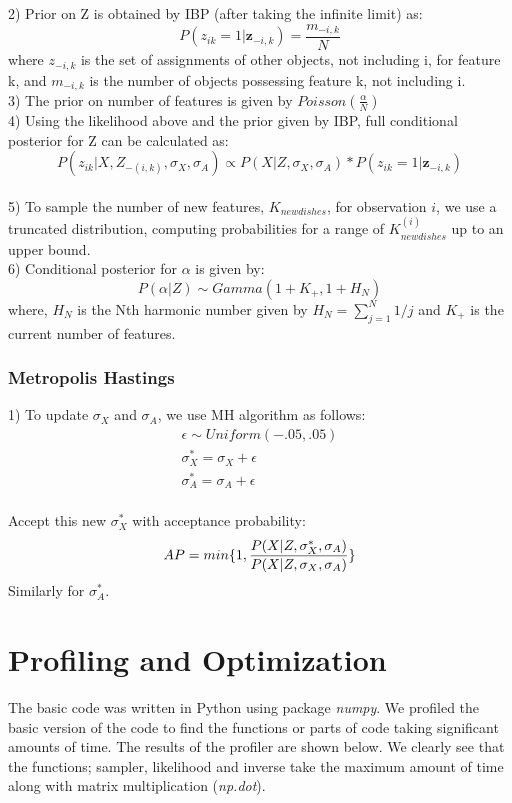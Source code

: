 \documentclass[11pt]{article}
\begin{document}
2) Prior on Z is obtained by IBP (after taking the infinite limit) as:
$$
P(z_{ik}=1|\textbf{z}_{-i,k}) = \frac{m_{-i,k}}{N}
$$
where ${z}_{-i,k}$ is the set of assignments of other objects, not including i, for feature k, and
${m}_{-i,k}$ is the number of objects possessing feature k, not including i.\\

3) The prior on number of features is given by $Poisson(\frac{\alpha}{N})$\\

4) Using the likelihood above and the prior given by IBP, full conditional posterior for Z can be calculated as:
$$
P(z_{ik}|X,Z_{-(i,k)},\sigma_X,\sigma_A) \propto  P(X|Z,\sigma_X,\sigma_A) * P(z_{ik}=1|\textbf{z}_{-i,k})
$$\\
5) To sample the number of new features, $K_{newdishes}$, for observation $i$, we use a truncated distribution, computing probabilities for a range of $K_{newdishes}^{(i)}$ up to an upper bound.\\

6) Conditional posterior for $\alpha$ is given by:
$$
P(\alpha|Z) \sim Gamma(1+K_+, 1+H_N)
$$
where, $H_N$ is the Nth harmonic number given by $H_N=\sum_{j=1}^{N} 1/j$ and $K_{+}$ is the current number of features.

\subsubsection{Metropolis Hastings}

1) To update $\sigma_X$ and $\sigma_A$, we use MH algorithm as follows:
\begin{eqnarray*}
\epsilon \sim Uniform(-.05,.05)\\
\sigma_X^{*} =  \sigma_X +\epsilon\\
\sigma_A^{*} =  \sigma_A +\epsilon\\
\end{eqnarray*}

Accept this new $\sigma_X^{*}$ with acceptance probability:
\begin{equation*}
AP = min\{1,\frac{P(X|Z, \sigma_X^{*}, \sigma_A)}{P(X|Z, \sigma_X,\sigma_A)}\}\\
\end{equation*}
Similarly for $\sigma_A^{*}$.

\section{Profiling and Optimization}
The basic code was written in Python using package \textit{numpy}. We profiled the basic version of the code to find the functions or parts of code taking significant amounts of time. The results of the profiler are shown below. We clearly see that the functions; sampler, likelihood and inverse take the maximum amount of time along with matrix multiplication (\textit{np.dot}).\\
\end{document}
